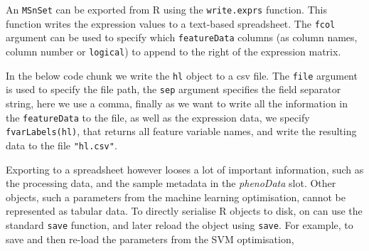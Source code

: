 An \texttt{MSnSet} can be exported from R using the
\texttt{write.exprs} function.  This function writes the expression
values to a text-based spreadsheet. The \texttt{fcol} argument can be
used to specify which \texttt{featureData} columns (as column names,
column number or \texttt{logical}) to append to the right of the
expression matrix.

In the below code chunk we write the \texttt{hl} object to a csv
file. The \texttt{file} argument is used to specify the file path, the
\texttt{sep} argument specifies the field separator string, here we
use a comma, finally as we want to write all the information in the
\texttt{featureData} to the file, as well as the expression data, we
specify \texttt{fvarLabels(hl)}, that returns all feature variable
names, and write the resulting data to the file \texttt{"hl.csv"}.

\begin{knitrout}
\color{fgcolor}\begin{kframe}
\begin{alltt}
  \hlstd{=} \hlstd{,}  \hlstd{=} \hlstd{,}  \hlstd{=} 
\end{alltt}
\end{kframe}
\end{knitrout}

Exporting to a spreadsheet however looses a lot of important
information, such as the processing data, and the sample metadata in
the \textit{phenoData} slot. Other objects, such a parameters from the
machine learning optimisation, cannot be represented as tabular
data. To directly serialise R objects to disk, on can use the standard
\texttt{save} function, and later reload the object using
\texttt{save}. For example, to save and then re-load the parameters
from the SVM optimisation,

\begin{knitrout}
\color{fgcolor}\begin{kframe}
\begin{alltt}
  \hlstd{=} \hlstd{)}

\hlstd{(} \hlstd{=} \hlstd{)}
\end{alltt}
\end{kframe}
\end{knitrout}

